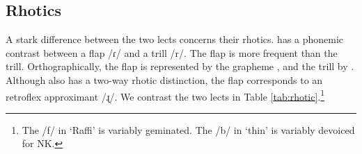 \subsection{Rhotics}\label{section:phono:segmental:rhotic}
A stark difference between the two lects concerns their rhotics. {\seaSEA}   has a phonemic contrast between a flap /{ɾ}/ and a trill /{r}/. The flap is more frequent than the trill. Orthographically, the flap is represented by the grapheme , and the trill by . Although {\iaIA}  also has a two-way rhotic distinction, the {\seaSE} flap corresponds to an {\iaIA} retroflex approximant /{ɻ}/. We contrast the two lects in Table \ref{tab:rhotic}.\footnote{The /{f}/ in `Raffi' is  variably geminated. The  /b/ in {\iaIA} `thin' is variably devoiced for NK.}


\begin{table}[p]
	\caption{Rhotic contrasts in {\seaSE} and {\iaIA}\label{tab:rhotic}}
\end{table}


